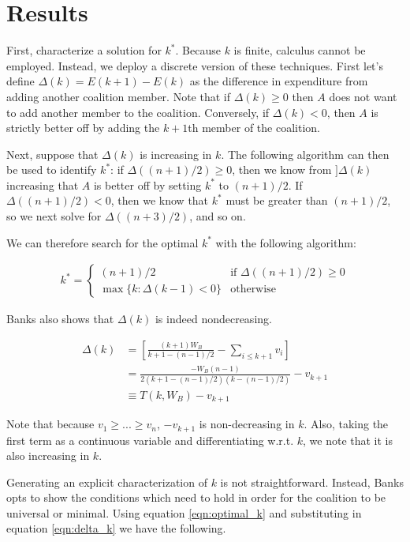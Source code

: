 \documentclass[12pt,a4paper]{article}
\begin{document}
\section{Results}

First, characterize a solution for $k^*$. Because $k$ is finite, calculus cannot be employed. Instead, we deploy a discrete version of these techniques. First let's define $\Delta(k) = E(k + 1) - E(k)$ as the difference in expenditure from adding another coalition member. Note that if $\Delta(k) \geq 0$ then $A$ does not want to add another member to the coalition. Conversely, if $\Delta(k) < 0$, then $A$ is strictly better off by adding the $k + 1$th member of the coalition.

Next, suppose that $\Delta(k)$ is increasing in $k$. The following algorithm can then be used to identify $k^*$: if $\Delta((n + 1)/2) \geq 0$, then we know from $]\Delta(k)$ increasing that $A$ is better off by setting $k^*$ to $(n + 1)/2$. If $\Delta((n + 1)/2) < 0$, then we know that $k^*$ must be greater than $(n + 1)/2$, so we next solve for $\Delta((n + 3)/2)$, and so on.

We can therefore search for the optimal $k^*$ with the following algorithm:

\begin{align}
    \label{eqn:optimal_k}
    k^* = 
    \begin{cases}
        (n + 1)/2 & \text{if } \Delta((n + 1)/2) \geq 0 \\
        \max\{k : \Delta(k - 1) < 0\} & \text{otherwise}
    \end{cases}
\end{align}

Banks also shows that $\Delta(k)$ is indeed nondecreasing.

\begin{align}
    \Delta(k)  & = \left[\frac{(k + 1)W_B}{k + 1 - (n - 1)/2} - \sum_{i \leq k + 1}v_i \right]\\
    \label{eqn:delta_k}
    & = \frac{-W_B (n - 1)}{2(k + 1 - (n - 1)/2)(k - (n - 1)/2)} - v_{k + 1}\\
    \label{eqn:def_delta_k}
    & \equiv T(k, W_B) - v_{k + 1}
\end{align}

Note that because $v_1 \geq ... \geq v_n$, $-v_{k + 1}$ is non-decreasing in $k$. Also, taking the first term as a continuous variable and differentiating w.r.t. $k$, we note that it is also increasing in $k$.

Generating an explicit characterization of $k$ is not straightforward. Instead, Banks opts to show the conditions which need to hold in order for the coalition to be universal or minimal. Using equation \ref{eqn:optimal_k} and substituting in equation \ref{eqn:delta_k} we have the following.
\end{document}
